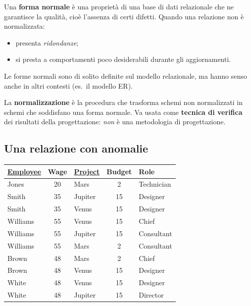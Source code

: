 \documentclass[a4paper,12pt]{article}
\begin{document}
Una \textbf{forma normale} è una proprietà di una base di dati relazionale che
ne garantisce la qualità, cioè l'assenza di certi difetti. Quando una relazione
non è normalizzata:
\begin{itemize}
  \item presenta \emph{ridondanze};
  \item si presta a comportamenti poco desiderabili durante gli aggiornamenti.
\end{itemize}
Le forme normali sono di solito definite sul modello relazionale, ma hanno
senso anche in altri contesti (es.\ il modello ER).

La \textbf{normalizzazione} è la procedura che trasforma schemi non
normalizzati in schemi che soddisfano una forma normale. Va usata come
\textbf{tecnica di verifica} dei risultati della progettazione: \emph{non} è
una metodologia di progettazione.

\subsection{Una relazione con anomalie}

\begin{center}
\begin{tabular}{|l|c|l|c|l|}
\hline
\underline{Employee} & Wage & \underline{Project} & Budget & Role\\ \hline
Jones & 20 & Mars & 2 & Technician\\
Smith & 35 & Jupiter & 15 & Designer\\
Smith & 35 & Venus & 15 & Designer\\
Williams & 55 & Venus & 15 & Chief\\
Williams & 55 & Jupiter & 15 & Consultant\\
Williams & 55 & Mars & 2 & Consultant\\
Brown & 48 & Mars & 2 & Chief\\
Brown & 48 & Venus & 15 & Designer\\
White & 48 & Venus & 15 & Designer\\
White & 48 & Jupiter & 15 & Director\\ \hline
\end{tabular}
\end{center}
\end{document}
